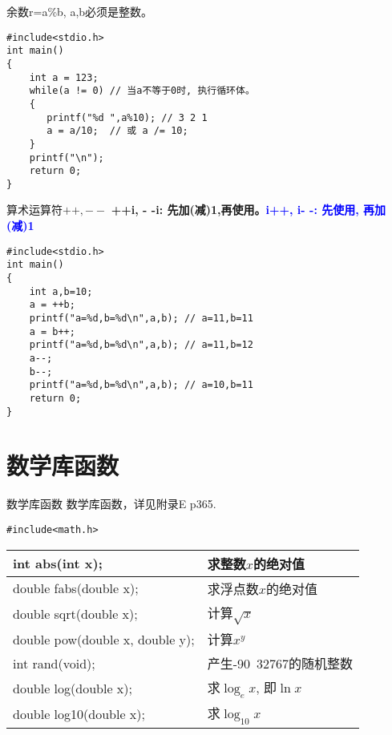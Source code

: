 \begin{frame}[fragile]{余数r=a\%b, a,b必须是整数。}
\begin{lstlisting}
#include<stdio.h>           
int main()                   
{                            
    int a = 123;
    while(a != 0) // 当a不等于0时, 执行循环体。
    {
       printf("%d ",a%10); // 3 2 1
       a = a/10;  // 或 a /= 10;
    }
    printf("\n");
    return 0;           
}                            
\end{lstlisting}
\end{frame}

\begin{frame}[fragile]{算术运算符$++,--$}
\textbf{++i, - -i: 先加(减)1,再使用。}\textcolor{blue}{\textbf{i++, i- -: 先使用, 再加(减)1}}
\begin{lstlisting}
#include<stdio.h>           
int main()                   
{                            
    int a,b=10;
    a = ++b;
    printf("a=%d,b=%d\n",a,b); // a=11,b=11  
    a = b++;
    printf("a=%d,b=%d\n",a,b); // a=11,b=12
    a--;
    b--;
    printf("a=%d,b=%d\n",a,b); // a=10,b=11
    return 0;           
}                            
\end{lstlisting}
\end{frame}

\section{数学库函数}

\begin{frame}[fragile]{数学库函数}
数学库函数，详见附录E p365.\\
\begin{lstlisting}
#include<math.h>
\end{lstlisting}
\begin{tabular}{|l|l|}
	\hline 
	int abs(int x);& 求整数$x$的绝对值 \\ 
	\hline 
    double fabs(double x); &求浮点数$x$的绝对值  \\ 
	\hline 
	double sqrt(double x); &计算$\sqrt{x}$\\ 
	\hline 
    double pow(double x, double y); &计算$x^y$\\ 
	\hline 
	int rand(void); &产生-90~32767的随机整数\\
	\hline 
	double log(double x); &求$\log_e x$, 即$\ln x$\\
	\hline 
	double log10(double x); &求$\log_{10} x$\\ 
	\hline  
\end{tabular} 
\end{frame}

